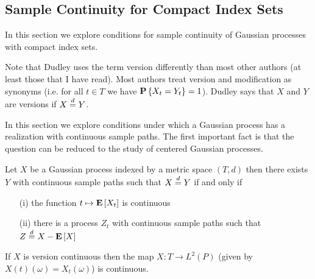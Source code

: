 \subsection{Sample Continuity for Compact Index Sets}

In this section we explore conditions for sample continuity of Gaussian processes with compact index sets.

Note that Dudley uses the term version differently than most other authors (at least those that I have read).  Most authors treat version and modification as synonyms (i.e. for all $t \in T$ we have $\textbf{P}\left \{X_t = Y_t \right \}=1$).  Dudley says that $X$ and $Y$ are versions if $X \overset{d}= Y$.

In this section we explore conditions under which a Gaussian process has a realization with continuous sample paths.  The first important fact is that the question can be reduced to the study of centered Gaussian processes.
\begin{thm}\label{GaussianVersionContinuityCentering}Let $X$ be a Gaussian process indexed by a metric space $(T,d)$ then there exists $Y$ with continuous sample paths such that $X \overset{d}= Y$ if and only if 
\begin{itemize}
\item[(i)] the function $t \mapsto \textbf{E}\left[X_t\right]$ is continuous
\item[(ii)] there is a process $Z_t$ with continuous sample paths such that $Z \overset{d}= X - \textbf{E}\left[X\right]$ 
\end{itemize}
If $X$ is version continuous then the map $X : T \to L^2(P)$ (given by $X (t)(\omega) = X_t(\omega)$) is continuous.
\end{thm}
